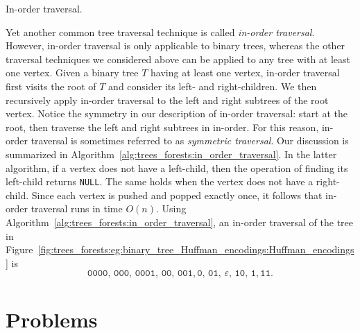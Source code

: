\begin{algorithm}[!htbp]

\caption{In-order traversal.}
\label{alg:trees_forests:in_order_traversal}
\end{algorithm}

Yet another common tree traversal technique is called
\emph{in-order traversal}. However, in-order
traversal is only applicable to binary trees,
whereas the other traversal techniques we considered above can be
applied to any tree with at least one vertex. Given a binary tree $T$
having at least one vertex, in-order traversal first visits the root
of $T$ and consider its left- and
right-children. We then
recursively apply in-order
traversal to the left and
right subtrees of the root vertex. Notice the
symmetry in our description of in-order
traversal: start at the root, then traverse the left and right
subtrees in in-order. For this reason, in-order traversal is sometimes
referred to as \emph{symmetric traversal}. Our discussion is
summarized in Algorithm~\ref{alg:trees_forests:in_order_traversal}.
In the latter algorithm, if a vertex does not have a left-child, then
the operation of finding its left-child returns \texttt{NULL}. The
same holds when the vertex does not have a right-child. Since each
vertex is pushed and popped exactly
once, it follows that in-order traversal runs in time $O(n)$. Using
Algorithm~\ref{alg:trees_forests:in_order_traversal}, an in-order
traversal of the tree in
Figure~\ref{fig:trees_forests:eg:binary_tree_Huffman_encodings:Huffman_encodings}
is
\[
\texttt{0000},\, \texttt{000},\, \texttt{0001},\, \texttt{00},\,
\texttt{001}, \texttt{0},\, \texttt{01},\, \varepsilon,\,
\texttt{10},\, \texttt{1},\texttt{11}.
\]



\section{Problems}

